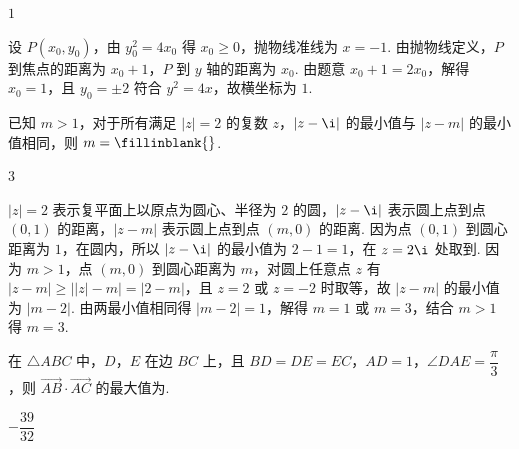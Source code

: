\begin{answer}
\(1\)
\end{answer}

\begin{solution}
设 \(P(x_0,y_0)\)，由 \(y_0^2=4x_0\) 得 \(x_0\ge0\)，抛物线准线为 \(x=-1\). 由抛物线定义，\(P\) 到焦点的距离为 \(x_0+1\)，\(P\) 到 \(y\) 轴的距离为 \(x_0\). 由题意 \(x_0+1=2x_0\)，解得 \(x_0=1\)，且 \(y_0=\pm2\) 符合 \(y^2=4x\)，故横坐标为 \(1\).
\end{solution}

\begin{problem}
已知 \(m>1\)，对于所有满足 \(|z|=2\) 的复数 \(z\)，\(|z-\i|\) 的最小值与 \(|z-m|\) 的最小值相同，则 \(m=\fillinblank{}\).
\end{problem}

\begin{answer}
\(3\)
\end{answer}

\begin{solution}
\(|z|=2\) 表示复平面上以原点为圆心、半径为 \(2\) 的圆，\(|z-\i|\) 表示圆上点到点 \((0,1)\) 的距离，\(|z-m|\) 表示圆上点到点 \((m,0)\) 的距离. 因为点 \((0,1)\) 到圆心距离为 \(1\)，在圆内，所以 \(|z-\i|\) 的最小值为 \(2-1=1\)，在 \(z=2\i\) 处取到. 因为 \(m>1\)，点 \((m,0)\) 到圆心距离为 \(m\)，对圆上任意点 \(z\) 有 \(|z-m|\ge\big||z|-m\big|=|2-m|\)，且 \(z=2\) 或 \(z=-2\) 时取等，故 \(|z-m|\) 的最小值为 \(|m-2|\). 由两最小值相同得 \(|m-2|=1\)，解得 \(m=1\) 或 \(m=3\)，结合 \(m>1\) 得 \(m=3\).
\end{solution}

\begin{problem}
在 \(\triangle ABC\) 中，\(D\)，\(E\) 在边 \(BC\) 上，且 \(BD=DE=EC\)，\(AD=1\)，\(\angle DAE=\dfrac{\pi}{3}\)，则 \(\overrightarrow{AB}\cdot\overrightarrow{AC}\) 的最大值为\fillinblank{}.

\end{problem}

\begin{answer}
\(-\dfrac{39}{32}\)
\end{answer}

